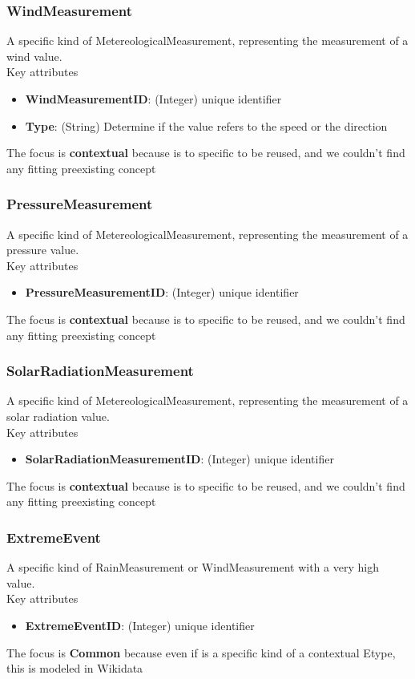 \subsubsection{WindMeasurement}
A specific kind of MetereologicalMeasurement, representing the measurement of a wind value.\\
Key attributes
\begin{itemize}
    \item \textbf{WindMeasurementID}: (Integer) unique identifier
    \item \textbf{Type}: (String) Determine if the value refers to the speed or the direction
\end{itemize}
The focus is \textbf{contextual} because is to specific to be reused, and we couldn't find any fitting preexisting concept
\subsubsection{PressureMeasurement}
A specific kind of MetereologicalMeasurement, representing the measurement of a pressure value.\\
Key attributes
\begin{itemize}
    \item \textbf{PressureMeasurementID}: (Integer) unique identifier
\end{itemize}
The focus is \textbf{contextual} because is to specific to be reused, and we couldn't find any fitting preexisting concept
\subsubsection{SolarRadiationMeasurement}
A specific kind of MetereologicalMeasurement, representing the measurement of a solar radiation value.\\
Key attributes
\begin{itemize}
    \item \textbf{SolarRadiationMeasurementID}: (Integer) unique identifier
\end{itemize}
The focus is \textbf{contextual} because is to specific to be reused, and we couldn't find any fitting preexisting concept
\subsubsection{ExtremeEvent}
A specific kind of RainMeasurement or WindMeasurement with a very high value.\\
Key attributes
\begin{itemize}
    \item \textbf{ExtremeEventID}: (Integer) unique identifier
\end{itemize}
The focus is \textbf{Common} because even if is a specific kind of a contextual Etype, this is modeled in Wikidata
